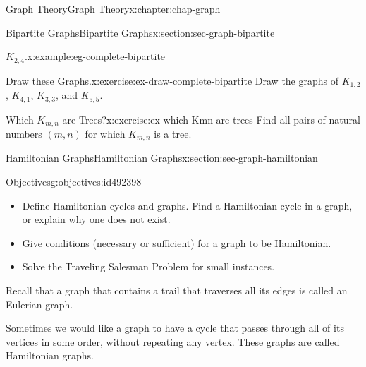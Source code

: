 \documentclass[oneside,10pt,]{book}
\numberwithin{equation}{section}
\begin{document}
\begin{chapterptx}{Graph Theory}{}{Graph Theory}{}{}{x:chapter:chap-graph}
\begin{sectionptx}{Bipartite Graphs}{}{Bipartite Graphs}{}{}{x:section:sec-graph-bipartite}
\begin{example}{\(K_{2,4}\).}{x:example:eg-complete-bipartite}
\begin{sidebyside}{1}{0.375}{0.375}{0}
\begin{sbspanel}{0.25}
{
}%
\end{sbspanel}%
\end{sidebyside}%
\end{example}
\begin{inlineexercise}{Draw these Graphs.}{x:exercise:ex-draw-complete-bipartite}%
Draw the graphs of \(K_{1,2}\), \(K_{4,1}\), \(K_{3,3}\), and \(K_{5,5}\).%
\end{inlineexercise}
\begin{inlineexercise}{Which \(K_{m,n}\) are Trees?}{x:exercise:ex-which-Kmn-are-trees}%
Find all pairs of natural numbers \((m,n)\) for which \(K_{m,n}\) is a tree.%
\end{inlineexercise}
\end{sectionptx}
%
%
\typeout{************************************************}
\typeout{************************************************}
%
\begin{sectionptx}{Hamiltonian Graphs}{}{Hamiltonian Graphs}{}{}{x:section:sec-graph-hamiltonian}
\begin{objectives}{Objectives}{g:objectives:id492398}
%
\begin{itemize}[label=\textbullet]
\item{}Define Hamiltonian cycles and graphs. Find a Hamiltonian cycle in a graph, or explain why one does not exist.%
\item{}Give conditions (necessary or sufficient) for a graph to be Hamiltonian.%
\item{}Solve the Traveling Salesman Problem for small instances.%
\end{itemize}
\end{objectives}
Recall that a graph that contains a trail that traverses all its edges is called an Eulerian graph.%
\par
Sometimes we would like a graph to have a cycle that passes through all of its vertices in some order, without repeating any vertex. These graphs are called Hamiltonian graphs.%

\end{sectionptx}
\end{chapterptx}
\end{document}
